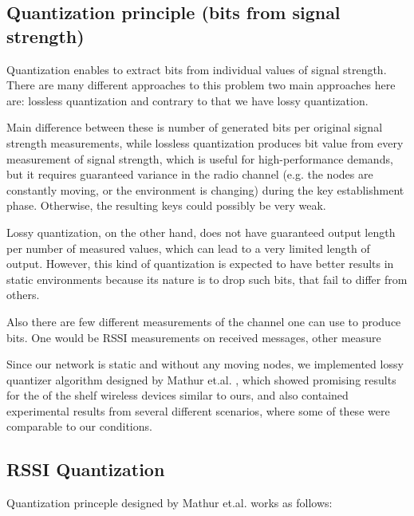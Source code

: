 \documentclass[
  digital, %
  table,   %
  nolof,     %
  nolot,     %
           oneside
]{fithesis3}
\begin{document}
  \subsection{Quantization principle (bits from signal strength)}
    Quantization enables to extract bits from individual values of signal strength. There are many different approaches to this problem %
    two main approaches here are: lossless quantization %
    and contrary to that we have lossy quantization.

    Main difference between these is number of generated bits per original signal strength measurements, while lossless quantization produces bit value from every measurement of signal strength, which is useful for high-performance demands, but it requires guaranteed variance in the radio channel (e.g. the nodes are constantly moving, or the environment is changing) during the key establishment phase. %
    Otherwise, the resulting keys could possibly be very weak. %

    Lossy quantization, on the other hand, does not have guaranteed output length per number of measured values, which can lead to a very limited length of output. However, this kind of quantization is expected to have better results in static environments %
    because its nature is to drop such bits, that fail to differ from others.

    Also there are few different measurements of the channel one can use to produce bits. One would be RSSI measurements on received messages, other measure %

    Since our network is static and without any moving nodes, we implemented lossy quantizer algorithm designed by Mathur et.al.%
    , which showed promising results for the of the shelf wireless devices similar to ours, and also contained experimental results from several different scenarios, where some of these were comparable to our conditions.



    \subsection{RSSI Quantization}
    Quantization princeple designed by Mathur et.al. %
     works as follows:
\end{document}
